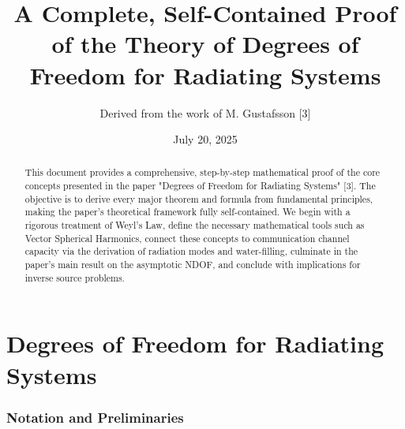 \documentclass[11pt,a4paper]{article}
\begin{document}

\part{Degrees of Freedom for Radiating Systems}

\title{A Complete, Self-Contained Proof of the Theory of Degrees of Freedom for Radiating Systems}
\author{Derived from the work of M. Gustafsson [3]}
\date{July 20, 2025}
\maketitle

\begin{abstract}
This document provides a comprehensive, step-by-step mathematical proof of the core concepts presented in the paper "Degrees of Freedom for Radiating Systems" [3]. The objective is to derive every major theorem and formula from fundamental principles, making the paper's theoretical framework fully self-contained. We begin with a rigorous treatment of Weyl's Law, define the necessary mathematical tools such as Vector Spherical Harmonics, connect these concepts to communication channel capacity via the derivation of radiation modes and water-filling, culminate in the paper's main result on the asymptotic NDOF, and conclude with implications for inverse source problems.
\end{abstract}

\tableofcontents
\newpage

\section{Notation and Preliminaries}
\end{document}
